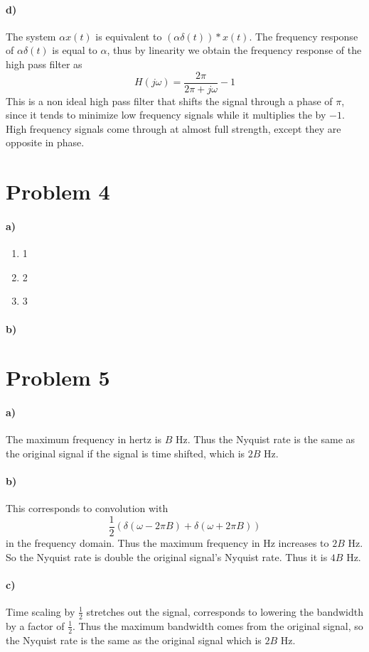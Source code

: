 \documentclass[12pt]{article}
\begin{document}
\paragraph{d)}

The system \(\alpha x(t)\) is equivalent to \((\alpha\delta(t))*x(t)\). The frequency response of \(\alpha\delta(t)\) is equal to \(\alpha\), thus by linearity we obtain the frequency response of the high pass filter as
\[H(j\omega)=\frac{2\pi}{2\pi+j\omega}-1\]
This is a non ideal high pass filter that shifts the signal through a phase of \(\pi\), since it tends to minimize low frequency signals while it multiplies the by \(-1\). High frequency signals come through at almost full
strength, except they are opposite in phase.

\section*{Problem 4}

\paragraph{a)}

\begin{enumerate}
    \item 1
    \item 2
    \item 3
\end{enumerate}

\paragraph{b)}

\section*{Problem 5}

\paragraph{a)}

The maximum frequency in hertz is \(B\) Hz. Thus the Nyquist rate is the same as the original signal if the signal is time shifted, which is \(2B\) Hz.

\paragraph{b)}

This corresponds to convolution with
\[\frac{1}{2}(\delta(\omega-2\pi B)+\delta(\omega+2\pi B))\]
in the frequency domain. Thus the maximum frequency in Hz increases to \(2B\) Hz. So the Nyquist rate is double the original signal's Nyquist rate.
Thus it is \(4B\) Hz.

\paragraph{c)}

Time scaling by \(\frac{1}{2}\) stretches out the signal, corresponds to lowering the bandwidth by a factor of \(\frac{1}{2}\). Thus the maximum bandwidth comes from
the original signal, so the Nyquist rate is the same as the original signal which is \(2B\) Hz.
\end{document}
